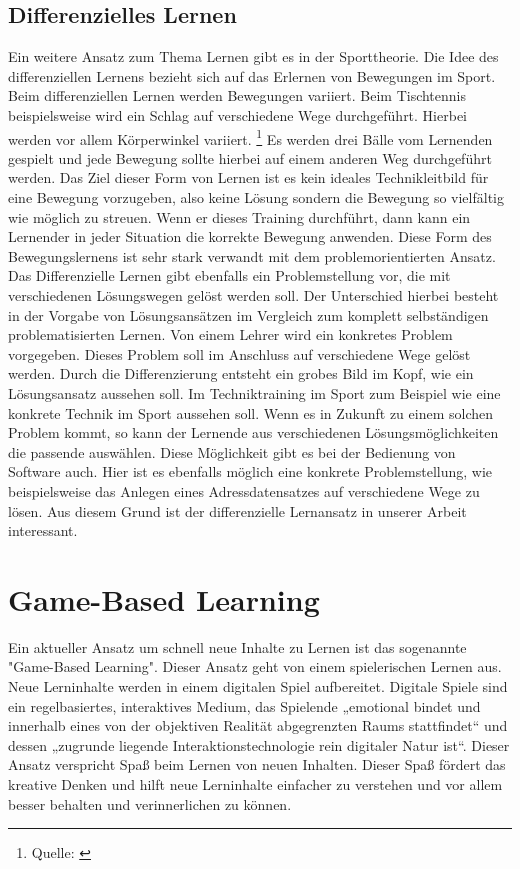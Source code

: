 \subsection{Differenzielles Lernen}
Ein weitere Ansatz zum Thema Lernen gibt es in der Sporttheorie. Die Idee des differenziellen Lernens bezieht sich auf das Erlernen von Bewegungen im Sport. Beim differenziellen Lernen werden Bewegungen variiert. Beim Tischtennis beispielsweise wird ein Schlag auf verschiedene Wege durchgeführt. Hierbei werden vor allem Körperwinkel variiert. \footnote{Quelle: \cite{differenziellesLernen}} Es werden drei Bälle vom Lernenden gespielt und jede Bewegung sollte hierbei auf einem anderen Weg durchgeführt werden. Das Ziel dieser Form von Lernen ist es kein ideales Technikleitbild für eine Bewegung vorzugeben, also keine Lösung sondern die Bewegung so vielfältig wie möglich zu streuen. Wenn er dieses Training durchführt, dann kann ein Lernender in jeder Situation die korrekte Bewegung anwenden. Diese Form des Bewegungslernens ist sehr stark verwandt mit dem problemorientierten Ansatz. Das Differenzielle Lernen gibt ebenfalls ein Problemstellung vor, die mit verschiedenen Lösungswegen gelöst werden soll. Der Unterschied hierbei besteht in der Vorgabe von Lösungsansätzen im Vergleich zum komplett selbständigen problematisierten Lernen. Von einem Lehrer wird ein konkretes Problem vorgegeben. Dieses Problem soll im Anschluss auf verschiedene Wege gelöst werden. Durch die Differenzierung entsteht ein grobes Bild im Kopf, wie ein Lösungsansatz aussehen soll. Im Techniktraining im Sport zum Beispiel wie eine konkrete Technik im Sport aussehen soll. Wenn es in Zukunft zu einem solchen Problem kommt, so kann der Lernende aus verschiedenen Lösungsmöglichkeiten die passende auswählen. Diese Möglichkeit gibt es bei der Bedienung von Software auch. Hier ist es ebenfalls möglich eine konkrete Problemstellung, wie beispielsweise das Anlegen eines Adressdatensatzes auf verschiedene Wege zu lösen. Aus diesem Grund ist der differenzielle Lernansatz in unserer Arbeit interessant.


\section{Game-Based Learning}
Ein aktueller Ansatz um schnell neue Inhalte zu Lernen ist das sogenannte "Game-Based Learning". Dieser Ansatz geht von einem spielerischen Lernen aus. Neue Lerninhalte werden in einem digitalen Spiel aufbereitet. Digitale Spiele sind ein regelbasiertes,
interaktives Medium, das Spielende „emotional bindet und innerhalb eines von der objektiven Realität abgegrenzten Raums stattfindet“ und dessen „zugrunde liegende Interaktionstechnologie rein digitaler Natur ist“. \cite{gameBased} Dieser Ansatz verspricht Spaß beim Lernen von neuen Inhalten. Dieser Spaß fördert das kreative Denken und hilft neue Lerninhalte einfacher zu verstehen und vor allem besser behalten und verinnerlichen zu können. 


